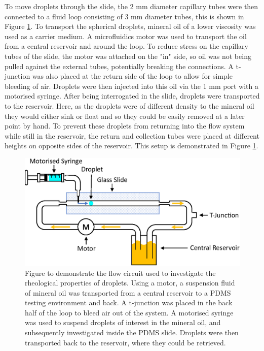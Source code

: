 \documentclass{physics_article_B}
\begin{document}
        To move droplets through the slide, the 2 mm diameter capillary tubes were then connected to a fluid loop consisting of 3 mm diameter tubes, this is shown in Figure \ref{fig:basic}. To transport the spherical droplets, mineral oil of a lower viscosity was used as a carrier medium. A microfluidics motor was used to transport the oil from a central reservoir and around the loop. To reduce stress on the capillary tubes of the slide, the motor was attached on the "in" side, so oil was not being pulled against the external tubes, potentially breaking the connections. A t-junction was also placed at the return side of the loop to allow for simple bleeding of air. Droplets were then injected into this oil via the 1 mm port with a motorised syringe. After being interrogated in the slide, droplets were transported to the reservoir. Here, as the droplets were of different density to the mineral oil they would either sink or float and so they could be easily removed at a later point by hand. To prevent these droplets from returning into the flow system while still in the reservoir, the return and collection tubes were placed at different heights on opposite sides of the reservoir. This setup is demonstrated in Figure \ref{fig:basic}.
        
            \begin{figure}[H]
                \centering
                    \hspace*{2.0cm}\includegraphics[scale=0.8]{Figures/Fluid.eps}
                    \caption{Figure to demonstrate the flow circuit used to investigate the rheological properties of droplets. Using a motor, a suspension fluid of mineral oil was transported from a central reservoir to a PDMS testing environment and back. A t-junction was placed in the back half of the loop to bleed air out of the system. A motorised syringe was used to suspend droplets of interest in the mineral oil, and subsequently investigated inside the PDMS slide. Droplets were then transported back to the reservoir, where they could be retrieved.} 	
                \label{fig:basic}
            \end{figure} 
\end{document}
